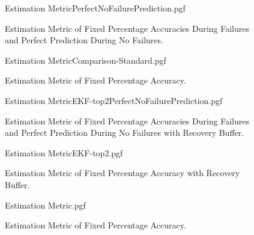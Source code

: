 \documentclass[letterpaper, 10 pt, conference]{ieeeconf}  %
\begin{document}
\begin{figure}[!htb]
	\begin{center}
		{Estimation MetricPerfectNoFailurePrediction.pgf}
	\end{center}
	\caption[Estimation Metric of Fixed Percentage Accuracies During Failures and Perfect Prediction During No Failures]{Estimation Metric of Fixed Percentage Accuracies During Failures and Perfect Prediction During No Failures.}
	\label{fig:Estimation Accuracy EKF-ignore Comparison PerfectNoFailure}
\end{figure}

\begin{figure}[!htb]
	\begin{center}
		{Estimation MetricComparison-Standard.pgf}
	\end{center}
	\caption[Estimation Metric of Fixed Percentage Accuracy]{Estimation Metric of Fixed Percentage Accuracy.}
	\label{fig:Estimation Accuracy EKF-ignore Comparison}
\end{figure}

\begin{figure}[!htb]
	\begin{center}
		{Estimation MetricEKF-top2PerfectNoFailurePrediction.pgf}
	\end{center}
	\caption[Estimation Metric of Fixed Percentage Accuracies During Failures and Perfect Prediction During No Failures with Recovery Buffer]{Estimation Metric of Fixed Percentage Accuracies During Failures and Perfect Prediction During No Failures with Recovery Buffer.}
	\label{fig:Estimation Accuracy EKF-ignore PerfectNoFailure with Recovery Buffer}
\end{figure}

\begin{figure}[!htb]
	\begin{center}
		{Estimation MetricEKF-top2.pgf}
	\end{center}
	\caption[Estimation Metric of Fixed Percentage Accuracy with Recovery Buffer]{Estimation Metric of Fixed Percentage Accuracy with Recovery Buffer.}
	\label{fig:Estimation Accuracy EKF-ignore with Recovery Buffer}
\end{figure}

\begin{figure}[!htb]
	\begin{center}
		{Estimation Metric.pgf}
	\end{center}
	\caption[Estimation Metric of $90.0\%$ Accuracy]{Estimation Metric of Fixed Percentage Accuracy.}
	\label{fig:Estimation Accuracy EKF-ignore 90}
\end{figure}
\end{document}
